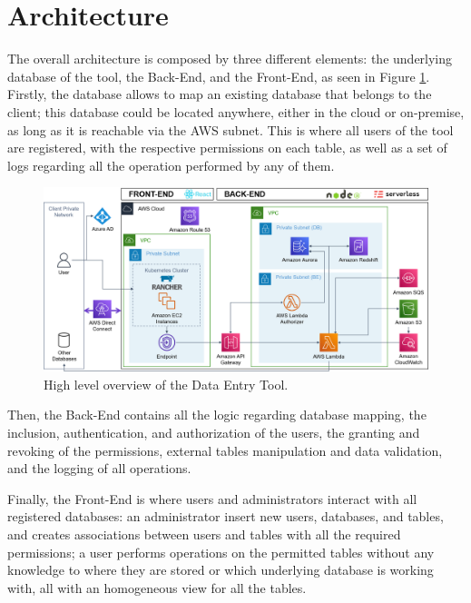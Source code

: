 \section{Architecture}
The overall architecture is composed by three different elements: the underlying database of the tool, the Back-End, and the Front-End, as seen in Figure \ref{fig:CompleteArch}.
Firstly, the database allows to map an existing database that belongs to the client; this database could be located anywhere, either in the cloud or on-premise, as long as it is reachable via the AWS subnet. This is where all users of the tool are registered, with the respective permissions on each table, as well as a set of logs regarding all the operation performed by any of them. 

\begin{figure}[!htb]
    \centering
    \includegraphics[width=15.8cm]{chapters/images/ch_3/CompleteArch.png}
    \caption{High level overview of the Data Entry Tool.}
    \label{fig:CompleteArch}
\end{figure}

Then, the Back-End contains all the logic regarding database mapping, the inclusion, authentication, and authorization of the users, the granting and revoking of the permissions, external tables manipulation and data validation, and the logging of all operations.

Finally, the Front-End is where users and administrators interact with all registered databases:
an administrator insert new users, databases, and tables, and creates associations between users and tables with all the required permissions; 
a user performs operations on the permitted tables without any knowledge to where they are stored or which underlying database is working with, all with an homogeneous view for all the tables.

